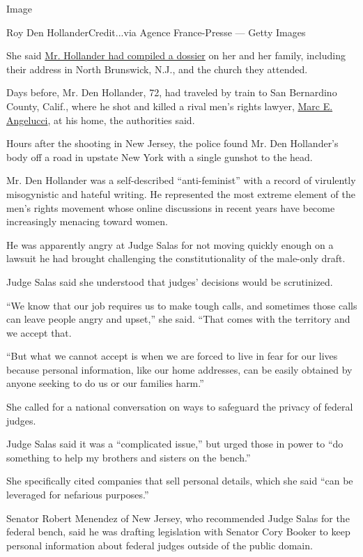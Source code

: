 Image

Roy Den HollanderCredit...via Agence France-Presse --- Getty Images

She said
\href{https://www.nytimes3xbfgragh.onion/2020/07/26/nyregion/roy-den-hollander-judge.html}{Mr.
Hollander had compiled a dossier} on her and her family, including their
address in North Brunswick, N.J., and the church they attended.

Days before, Mr. Den Hollander, 72, had traveled by train to San
Bernardino County, Calif., where he shot and killed a rival men's rights
lawyer,
\href{https://www.nytimes3xbfgragh.onion/2020/07/22/nyregion/roy-den-hollander-esther-salas.html}{Marc
E. Angelucci}, at his home, the authorities said.

Hours after the shooting in New Jersey, the police found Mr. Den
Hollander's body off a road in upstate New York with a single gunshot to
the head.

Mr. Den Hollander was a self-described ``anti-feminist'' with a record
of virulently misogynistic and hateful writing. He represented the most
extreme element of the men's rights movement whose online discussions in
recent years have become increasingly menacing toward women.

He was apparently angry at Judge Salas for not moving quickly enough on
a lawsuit he had brought challenging the constitutionality of the
male-only draft.

Judge Salas said she understood that judges' decisions would be
scrutinized.

``We know that our job requires us to make tough calls, and sometimes
those calls can leave people angry and upset,'' she said. ``That comes
with the territory and we accept that.

``But what we cannot accept is when we are forced to live in fear for
our lives because personal information, like our home addresses, can be
easily obtained by anyone seeking to do us or our families harm.''

She called for a national conversation on ways to safeguard the privacy
of federal judges.

Judge Salas said it was a ``complicated issue,'' but urged those in
power to ``do something to help my brothers and sisters on the bench.''

She specifically cited companies that sell personal details, which she
said ``can be leveraged for nefarious purposes.''

Senator Robert Menendez of New Jersey, who recommended Judge Salas for
the federal bench, said he was drafting legislation with Senator Cory
Booker to keep personal information about federal judges outside of the
public domain.

